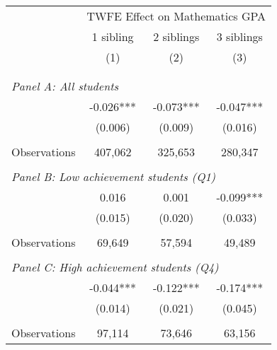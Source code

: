 \makeatletter
{}
{
\makeatother
\begin{tabular}{lccc}
\toprule
\cmidrule(lr){2-4}
& \multicolumn{3}{c}{TWFE Effect on Mathematics GPA} \\
\cmidrule(lr){2-4}
& 1 sibling & 2 siblings & 3 siblings  \\
\cmidrule(lr){2-2} \cmidrule(lr){3-3} \cmidrule(lr){4-4}
& (1) & (2) & (3)\\
\bottomrule
&  &  &  \\
&  &  &   \\
\multicolumn{4}{l}{\textit{Panel A: All students}} \\
\hspace{3mm}        &      -0.026***&      -0.073***&      -0.047***\\
                    &     (0.006)   &     (0.009)   &     (0.016)   \\
                    &               &               &               \\
\hspace{3mm}Observations&     407,062   &     325,653   &     280,347   \\
 
&  &  &   \\
\multicolumn{4}{l}{\textit{Panel B: Low achievement students (Q1)}} \\
\hspace{3mm}        &       0.016   &       0.001   &      -0.099***\\
                    &     (0.015)   &     (0.020)   &     (0.033)   \\
                    &               &               &               \\
\hspace{3mm}Observations&      69,649   &      57,594   &      49,489   \\
 
&  &  &   \\
\multicolumn{4}{l}{\textit{Panel C: High achievement students (Q4)}} \\
\hspace{3mm}        &      -0.044***&      -0.122***&      -0.174***\\
                    &     (0.014)   &     (0.021)   &     (0.045)   \\
                    &               &               &               \\
\hspace{3mm}Observations&      97,114   &      73,646   &      63,156   \\
 

\end{tabular}}
